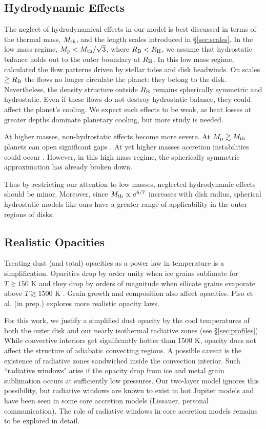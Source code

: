 \documentclass[apj, numberedappendix]{emulateapj}
\newcommand{\RB}{R_{\rm B}}
\newcommand{\RH}{R_{\rm H}}
\newcommand{\pla}{_{\rm p}}
\begin{document}
\subsection{Hydrodynamic Effects}\label{sec:hydro}
The neglect of hydrodynamical effects in our model is best discussed in terms of the thermal mass, $M_{\rm th}$, and the length scales introduced in \S\ref{sec:scales}.  In the low mass regime, $M\pla < M_{\rm th}/ \sqrt{3}$, where $\RB < \RH$, we assume that hydrostatic balance holds out to the outer boundary at $\RH$.   In this low mass regime, \citet[]{Orm13} calculated the flow patterns driven by stellar tides and disk headwinds.     On scales $\gtrsim \RB$ the flows no longer circulate the planet: they belong to the disk.  Nevertheless, the density structure outside $\RB$ remains spherically symmetric and hydrostatic.  Even if these flows do not destroy hydrostatic balance, they could affect the planet's cooling.  We expect such effects to be weak, as heat losses at greater depths dominate planetary cooling, but more study is needed.

At higher masses, non-hydrostatic effects become more severe.  At $M\pla \gtrsim M_{\rm th}$ planets can open significant gaps \citep{zhu13}.  At yet higher masses accretion instabilities could occur \citep{AylBat12}.  However, in this high mass regime, the spherically symmetric approximation has already broken down. 

Thus by restricting our attention to low masses, neglected hydrodynamic effects should be minor.   Moreover, since $M_{\rm th} \propto a^{6/7}$ increases with disk radius, spherical hydrostatic models like ours have a greater range of applicability in the outer regions of disks. 


\subsection{Realistic Opacities}\label{sec:op}

Treating dust (and total) opacities as a power law in temperature is a simplification.  Opacities drop by order unity when ice grains sublimate for $T \gtrsim 150$ K and they drop by orders of magnitude when silicate grains evaporate above $T \gtrsim 1500$ K \citep{semenov03, FerAle05}.  Grain growth and composition also affect opacities.  Piso et al. (in prep.) explores more realistic opacity laws.

For this work, we justify a simplified dust opacity by the cool temperatures of both the outer disk and our nearly isothermal radiative zones (see \S\ref{sec:profiles}).  While  convective interiors get significantly hotter than 1500 K, opacity does not affect the structure of adiabatic convecting regions.   A possible caveat is the existence of  radiative zones sandwiched inside the convection interior.  Such ``radiative windows" arise if the opacity drop from ice and metal grain sublimation occurs at sufficiently low pressures.  Our two-layer model ignores this possibility, but radiative windows are known to exist in hot Jupiter models \citep{burrows97, ab06} and have been seen in some core accretion models (Lissauer, personal communication).  The role of radiative windows in core accretion models remains to be explored in detail.
\end{document}

